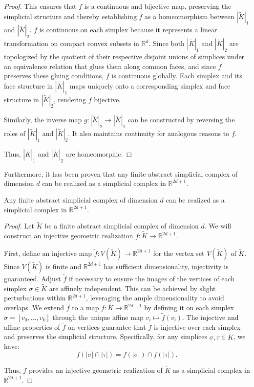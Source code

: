 \begin{proof}
	This ensures that $f$ is a continuous and bijective map, preserving
	the simplicial structure and thereby establishing $f$ as a homeomorphism between
	$|\tilde{K}|_{1}$ and $|\tilde{K}|_{2}$. $f$ is continuous on each simplex because it represents a linear transformation
	on compact convex subsets in $\mathbb{R}^{d}$. Since both $|\tilde{K}|_{1}$
	and $|\tilde{K}|_{2}$ are topologized by the quotient of their respective
	disjoint unions of simplices under an equivalence relation that glues them
	along common faces, and since $f$ preserves these gluing conditions, $f$ is
	continuous globally. Each simplex and its face structure in $|\tilde{K}|_{1}$ maps
	uniquely onto a corresponding simplex and face structure in $|\tilde{K}|_{2}$,
	rendering $f$ bijective.

	Similarly, the inverse map $g: |\tilde{K}|_{2} \to |\tilde{K}|_{1}$ can be constructed
	by reversing the roles of $|\tilde{K}|_{1}$ and $|\tilde{K}|_{2}$. It also
	maintains continuity for analogous reasons to $f$.

	Thus, $|\tilde{K}|_{1}$ and $|\tilde{K}|_{2}$ are homeomorphic.
\end{proof}

Furthermore, it has been proven that any finite abstract simplicial complex of dimension
$d$ can be realized as a simplicial complex in $\mathbb{R}^{2d+1}$.

\begin{theorem}
	Any finite abstract simplicial complex of dimension $d$ can be realized as a simplicial
	complex in $\mathbb{R}^{2d+1}$.
\end{theorem}

\begin{proof}
	Let $\tilde{K}$ be a finite abstract simplicial complex of dimension $d$. We
	will construct an injective geometric realization
	$f: \tilde{K}\to \mathbb{R}^{2d+1}$.

	First, define an injective map $\tilde{f}: V(\tilde{K}) \to \mathbb{R}^{2d+1}$
	for the vertex set $V(\tilde{K})$ of $\tilde{K}$. Since $V(\tilde{K})$ is
	finite and $\mathbb{R}^{2d+1}$ has sufficient dimensionality, injectivity is guaranteed.
	Adjust $\tilde{f}$ if necessary to ensure the images of the vertices of each
	simplex $\sigma \in \tilde{K}$ are affinely independent. This can be achieved by
	slight perturbations within $\mathbb{R}^{2d+1}$, leveraging the ample
	dimensionality to avoid overlaps. We extend $\tilde{f}$ to a map $f: \tilde{K}\to \mathbb{R}^{2d+1}$ by defining
	it on each simplex $\sigma = [v_{0}, \ldots, v_{k}]$ through the unique affine
	map $v_{i} \mapsto \tilde{f}(v_{i})$. The injective and affine properties of $\tilde
	{f}$ on vertices guarantee that $f$ is injective over each simplex and preserves
	the simplicial structure. Specifically, for any simplices $\sigma, \tau \in \tilde
	{K}$, we have:
	\[
		f(|\sigma| \cap |\tau|) = f(|\sigma|) \cap f(|\tau|).
	\]

	Thus, $f$ provides an injective geometric realization of $\tilde{K}$ as a simplicial
	complex in $\mathbb{R}^{2d+1}$.
\end{proof}

